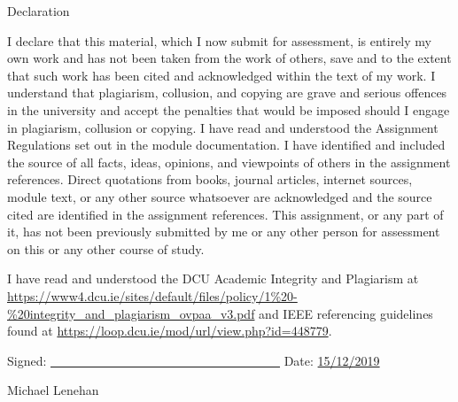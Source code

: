 \thispagestyle{plain}
\begingroup
\renewcommand{\cleardoublepage}{}
\renewcommand{\clearpage}{}

\LARGE{Declaration}

\endgroup

\vskip 1cm

I declare that this material, which I now submit for assessment, is entirely my
own work and has not been taken from the work of others, save and to the extent
that such work has been cited and acknowledged within the text of my work. I
understand that plagiarism, collusion, and copying are grave and serious
offences in the university and accept the penalties that would be imposed should
I engage in plagiarism, collusion or copying. I have read and understood the
Assignment Regulations set out in the module documentation. I have identified
and included the source of all facts, ideas, opinions, and viewpoints of others
in the assignment references. Direct quotations from books, journal articles,
internet sources, module text, or any other source whatsoever are acknowledged
and the source cited are identified in the assignment references. This
assignment, or any part of it, has not been previously submitted by me or any
other person for assessment on this or any other course of study.

I have read and understood the DCU Academic Integrity and Plagiarism at
\url{https://www4.dcu.ie/sites/default/files/policy/1%20-%20integrity_and_plagiarism\_ovpaa_v3.pdf}
and IEEE referencing guidelines found at
\url{https://loop.dcu.ie/mod/url/view.php?id=448779}.

\vskip 1cm
Signed: \underline{\ \ \ \ \ \ \ \ \ \ \ \ \ \ \ \ \ \ \ \ \ \ \ \ \ \ \ \ \ \ \
\ \ \ \ \ \ } \hspace{20mm}Date: \underline{15/12/2019}

\hspace*{0mm}\phantom{Signed:}Michael Lenehan

\pagebreak
